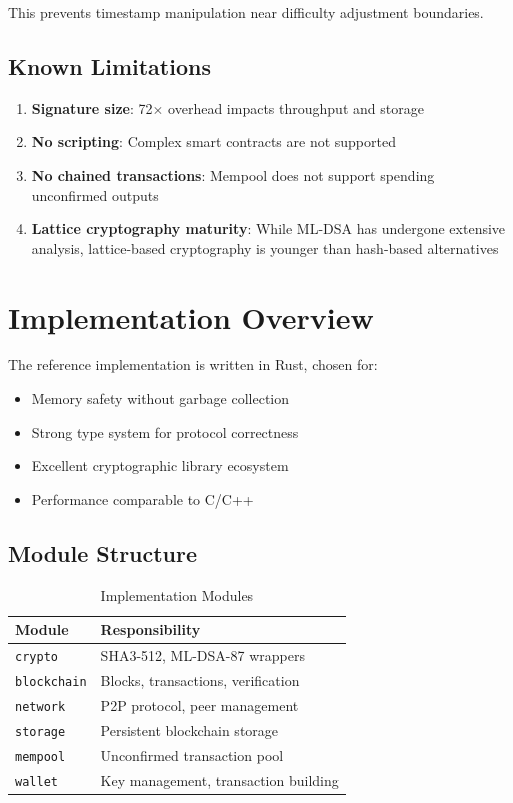 \documentclass[11pt,a4paper]{article}
\begin{document}
This prevents timestamp manipulation near difficulty adjustment boundaries.

\subsection{Known Limitations}

\begin{enumerate}
    \item \textbf{Signature size}: 72$\times$ overhead impacts throughput and storage
    \item \textbf{No scripting}: Complex smart contracts are not supported
    \item \textbf{No chained transactions}: Mempool does not support spending unconfirmed outputs
    \item \textbf{Lattice cryptography maturity}: While ML-DSA has undergone extensive analysis, lattice-based cryptography is younger than hash-based alternatives
\end{enumerate}

\section{Implementation Overview}

The reference implementation is written in Rust, chosen for:

\begin{itemize}
    \item Memory safety without garbage collection
    \item Strong type system for protocol correctness
    \item Excellent cryptographic library ecosystem
    \item Performance comparable to C/C++
\end{itemize}

\subsection{Module Structure}

\begin{table}[h]
\centering
\caption{Implementation Modules}
\begin{tabular}{@{}ll@{}}
\toprule
Module & Responsibility \\
\midrule
\texttt{crypto} & SHA3-512, ML-DSA-87 wrappers \\
\texttt{blockchain} & Blocks, transactions, verification \\
\texttt{network} & P2P protocol, peer management \\
\texttt{storage} & Persistent blockchain storage \\
\texttt{mempool} & Unconfirmed transaction pool \\
\texttt{wallet} & Key management, transaction building \\
\bottomrule
\end{tabular}
\end{table}
\end{document}
